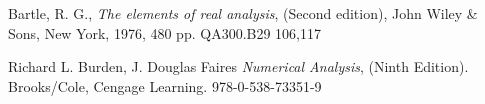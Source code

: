 \documentclass[a4paper]{article}
\begin{document}
\begin{thebibliography}{99}

 Bartle, R. G., \textit{The elements of real analysis}, (Second edition), John Wiley \& Sons, New York, 1976, 480 pp. QA300.B29 106,117

 Richard L. Burden, J. Douglas Faires \textit{Numerical Analysis}, (Ninth Edition). Brooks/Cole, Cengage Learning. 978-0-538-73351-9






\end{thebibliography}
\end{document}
